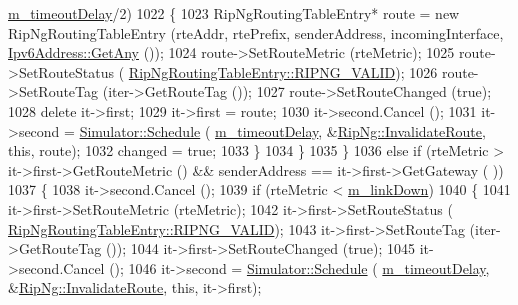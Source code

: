 \begin{DoxyCode}
      \hyperlink{classns3_1_1RipNg_aed45845b278332b589e76304a3701d72}{m\_timeoutDelay}/2)
1022                         \{
1023                           RipNgRoutingTableEntry* route = \textcolor{keyword}{new} RipNgRoutingTableEntry (rteAddr, rtePrefix, 
      senderAddress, incomingInterface, \hyperlink{classns3_1_1Ipv6Address_a2783e8badfc98c8b0a8508bba6e1b91e}{Ipv6Address::GetAny} ());
1024                           route->SetRouteMetric (rteMetric);
1025                           route->SetRouteStatus (
      \hyperlink{classns3_1_1RipNgRoutingTableEntry_af723fc23e97afdd05c55da5162b7e673a334e33ca88fb2b8de53c814814d3c017}{RipNgRoutingTableEntry::RIPNG\_VALID});
1026                           route->SetRouteTag (iter->GetRouteTag ());
1027                           route->SetRouteChanged (\textcolor{keyword}{true});
1028                           \textcolor{keyword}{delete} it->first;
1029                           it->first = route;
1030                           it->second.Cancel ();
1031                           it->second = \hyperlink{classns3_1_1Simulator_a671882c894a08af4a5e91181bf1eec13}{Simulator::Schedule} (
      \hyperlink{classns3_1_1RipNg_aed45845b278332b589e76304a3701d72}{m\_timeoutDelay}, &\hyperlink{classns3_1_1RipNg_ae4fc1ca9ed948f3c028fd96fb016f7dd}{RipNg::InvalidateRoute}, \textcolor{keyword}{this}, route);
1032                           changed = \textcolor{keyword}{true};
1033                         \}
1034                     \}
1035                 \}
1036               \textcolor{keywordflow}{else} \textcolor{keywordflow}{if} (rteMetric > it->first->GetRouteMetric () && senderAddress == it->first->GetGateway (
      ))
1037                 \{
1038                   it->second.Cancel ();
1039                   \textcolor{keywordflow}{if} (rteMetric < \hyperlink{classns3_1_1RipNg_a6752c1bb1fc0909f0493033d426f2b92}{m\_linkDown})
1040                     \{
1041                       it->first->SetRouteMetric (rteMetric);
1042                       it->first->SetRouteStatus (
      \hyperlink{classns3_1_1RipNgRoutingTableEntry_af723fc23e97afdd05c55da5162b7e673a334e33ca88fb2b8de53c814814d3c017}{RipNgRoutingTableEntry::RIPNG\_VALID});
1043                       it->first->SetRouteTag (iter->GetRouteTag ());
1044                       it->first->SetRouteChanged (\textcolor{keyword}{true});
1045                       it->second.Cancel ();
1046                       it->second = \hyperlink{classns3_1_1Simulator_a671882c894a08af4a5e91181bf1eec13}{Simulator::Schedule} (
      \hyperlink{classns3_1_1RipNg_aed45845b278332b589e76304a3701d72}{m\_timeoutDelay}, &\hyperlink{classns3_1_1RipNg_ae4fc1ca9ed948f3c028fd96fb016f7dd}{RipNg::InvalidateRoute}, \textcolor{keyword}{this}, it->first);

\end{DoxyCode}
